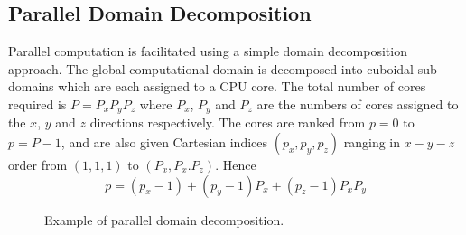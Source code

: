 \documentclass[dvips]{article}
\begin{document}
\subsection{Parallel Domain Decomposition}
Parallel computation is facilitated using a simple domain decomposition
approach.  The global computational domain is decomposed into cuboidal
sub--domains which are each assigned to a CPU core.  The total
number of cores required is $P = P_{x}P_{y}P_{z}$ where $P_{x}$, $P_{y}$ and
$P_{z}$ are the numbers of cores assigned to the $x$, $y$ and $z$ directions
respectively.  The cores are ranked from $p=0$ to $p=P-1$, and are also
given Cartesian indices $(p_{x},p_{y},p_{z})$ ranging in $x-y-z$
order from $(1,1,1)$ to $(P_{x},P_{x}.P_{z})$.  Hence
\begin{equation}
p = (p_{x}-1) + (p_{y}-1)P_{x} + (p_{z}-1)P_{x}P_{y}
\end{equation}

\begin{figure}[htbp]
\begin{center}
\caption{Example of parallel domain decomposition.}
\end{center}
\end{figure}
\end{document}
